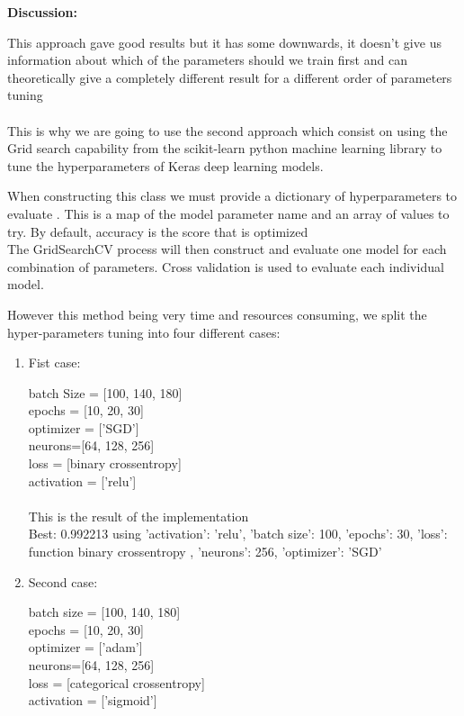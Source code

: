 \documentclass[12pt,a4paper]{report}
\begin{document}
\begin{enumerate}
\begin{enumerate}
\textbf{Discussion:}

This approach gave good results but it has some downwards, it doesn't give us information about which of the parameters should we train first and can theoretically give a completely different result for a different order of parameters tuning 
\\
\\

This is why we are going to use the second approach which consist on using the Grid search capability from the scikit-learn python machine learning library to tune the hyperparameters of Keras deep learning models.

When constructing this class we must provide a dictionary of hyperparameters to evaluate . This is a map of the model parameter name and an array of values to try.
By default, accuracy is the score that is optimized
\\

The GridSearchCV process will then construct and evaluate one model for each combination of parameters. Cross validation is used to evaluate each individual model.

However this method being very time and resources consuming, we split the hyper-parameters tuning into four different cases:

\begin{enumerate}
\item Fist case:

batch Size = [100,  140,  180]\\
epochs = [10, 20, 30]\\
optimizer = ['SGD']\\
neurons=[64, 128, 256]\\
loss = [binary crossentropy]\\
activation = ['relu']\\
\\
This is the  result of the implementation \\
Best: 0.992213 using {'activation': 'relu', 'batch size': 100, 'epochs': 30, 'loss': function binary crossentropy , 'neurons': 256, 'optimizer': 'SGD'}

\item Second case:

batch size = [100,  140,  180]\\
epochs = [10, 20, 30]\\
optimizer = ['adam']\\
neurons=[64, 128, 256]\\
loss = [categorical crossentropy]\\
activation = ['sigmoid']
\\


\end{enumerate}
\end{enumerate}
\end{enumerate}
\end{document}
